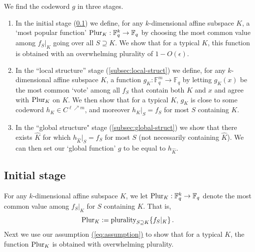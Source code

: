 \documentclass{toc}
\renewcommand{\eqref}[1]{\hyperref[#1]{(\ref*{#1})}}
\theoremstyle{plain}
\newcommand{\F}{{\mathbb{F}}}
\newcommand{\plurality}{{\rm{plurality}}}
\newcommand{\pl}{{\rm{Plur}}}
\begin{document}
We find the codeword $g$ in three stages.
\begin{enumerate}
  \item In the initial stage (\cref{subsec:init}) we define, for any $k$-dimensional affine subspace $K$, a `most popular function' %
$\pl_K: \F_q^k \to \F_q$ by choosing the most common value among $f_S|_K$ going over all $S\supseteq K$. We show that for a typical $K$, this function is obtained with an overwhelming plurality of $1-O(\epsilon)$.
  \item In the ``local structure'' stage (\cref{subsec:local-struct}) we define, for any $k$-dimensional affine subspace $K$, a function $g_K: \F_q^m \to \F_q$ by letting $g_K(x)$ be the most common `vote' %
among all $f_S$ that contain both $K$ and $x$ and agree with $\pl_K$ on $K$. We then show that for a typical $K$, $g_K$ is close to some codeword $h_K \in C^{\ell \nearrow m}$, and moreover $h_K|_S = f_S$ for most $S$ containing $K$.
\item In the ``global structure" stage (\cref{subsec:global-struct}) we show that there exists $\hat K$ for which $h_{\hat K}|_S = f_S$  for most $S$ (not necessarily containing $\hat K$). We can then set our
`global function' %
$g$ to be equal to $h_{\hat K}$.
\end{enumerate}

\subsection{Initial stage}\label{subsec:init}

For any $k$-dimensional affine subspace $K$, we let $\pl_K: \F_q^k \to \F_q$ denote the most common value among $f_S|_K$ for $S$ containing $K$. That is,
\[\pl_K := \plurality_{S\supseteq K}\{f_S|_K \}\,.\]
Next we use our assumption \eqref{eq:assumption} to show that for a typical $K$, the function $\pl_K$ is obtained with overwhelming plurality.
\end{document}
